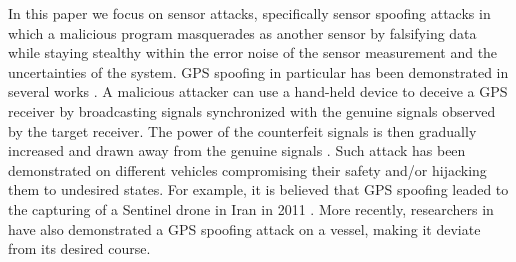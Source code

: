 \documentclass[letterpaper, 10 pt, conference]{ieeeconf}  %
\begin{document}
In this paper we focus on sensor attacks, specifically sensor spoofing attacks in which a malicious program masquerades as another sensor by falsifying data while staying stealthy within the error noise of the sensor measurement and the uncertainties of the system. GPS spoofing in particular has been demonstrated in several works \cite{humphreys2008assessing, protecting_gps_2016, peterson_faramarzi_2011}. A malicious attacker can use a hand-held device to deceive a GPS receiver by broadcasting signals synchronized with the genuine signals observed by the target receiver. The power of the counterfeit signals is then gradually increased and drawn away from the genuine signals \cite{humphreys2008assessing}. Such attack has been demonstrated on different vehicles compromising their safety and/or hijacking them to undesired states.
%
%
For example, it is believed that GPS spoofing leaded to the capturing of a Sentinel drone in Iran in 2011 \cite{peterson_faramarzi_2011}. More recently, researchers in \cite{protecting_gps_2016} have also demonstrated a GPS spoofing attack on a vessel, making it deviate from its desired course.
 
\end{document}
